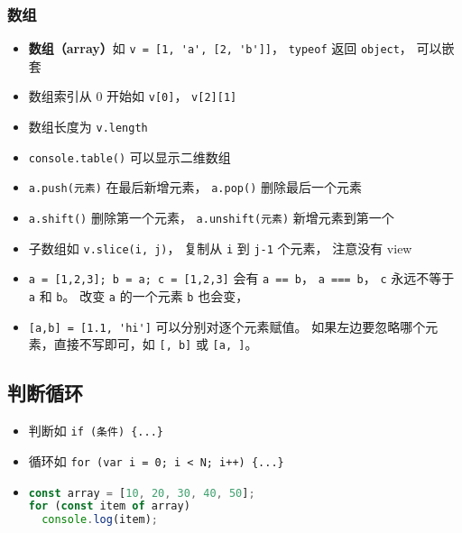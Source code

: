 \subsubsection{数组}
\begin{itemize}
\item \textbf{数组（array）}如 \verb|v = [1, 'a', [2, 'b']]|， \verb|typeof| 返回 \verb|object|， 可以嵌套
\item 数组索引从 0 开始如 \verb|v[0]|， \verb|v[2][1]|
\item 数组长度为 \verb|v.length|
\item \verb|console.table()| 可以显示二维数组
\item \verb|a.push(元素)| 在最后新增元素， \verb|a.pop()| 删除最后一个元素
\item \verb|a.shift()| 删除第一个元素， \verb|a.unshift(元素)| 新增元素到第一个
\item 子数组如 \verb|v.slice(i, j)|， 复制从 \verb|i| 到 \verb|j-1| 个元素， 注意没有 view
\item \verb|a = [1,2,3]; b = a; c = [1,2,3]| 会有 \verb|a == b|， \verb|a === b|， \verb|c| 永远不等于 \verb|a| 和 \verb|b|。 改变 \verb|a| 的一个元素 \verb|b| 也会变， 
\item \verb`[a,b] = [1.1, 'hi']` 可以分别对逐个元素赋值。 如果左边要忽略哪个元素，直接不写即可，如 \verb`[, b]` 或 \verb`[a, ]`。
\end{itemize}

\subsection{判断循环}
\begin{itemize}
\item 判断如 \verb|if (条件) {...}|
\item 循环如 \verb|for (var i = 0; i < N; i++) {...}|
\item 
\begin{lstlisting}[language=js]
const array = [10, 20, 30, 40, 50];
for (const item of array)
  console.log(item);
\end{lstlisting}
\end{itemize}

